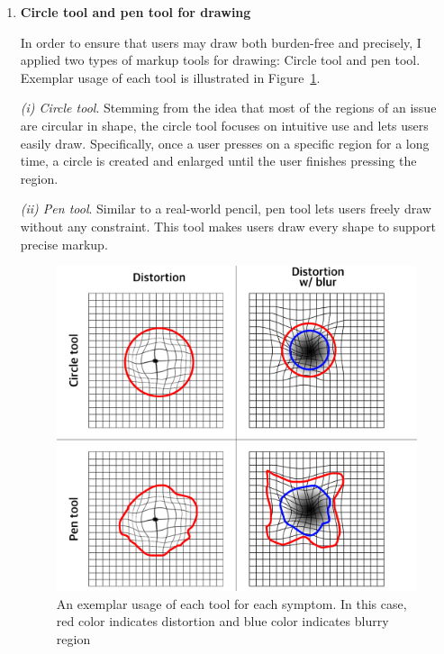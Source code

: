 \begin{enumerate}
    \item \textbf{Circle tool and pen tool for drawing}
    
    In order to ensure that users may draw both burden-free and precisely, I applied two types of markup tools for drawing: Circle tool and pen tool. Exemplar usage of each tool is illustrated in Figure~\ref{fig:drawings}.
    
    \textit{(i) Circle tool}. Stemming from the idea that most of the regions of an issue are circular in shape, the circle tool focuses on intuitive use and lets users easily draw. Specifically, once a user presses on a specific region for a long time, a circle is created and enlarged until the user finishes pressing the region.%
    
    \textit{(ii) Pen tool}. Similar to a real-world pencil, pen tool lets users freely draw without any constraint. This tool makes users draw every shape to support precise markup.
    
    
    \begin{figure}[h!]
        \centering
        \includegraphics[width=.9\linewidth]{figure/drawings.jpg}
        \caption{An exemplar usage of each tool for each symptom. In this case, red color indicates distortion and blue color indicates blurry region}
        \label{fig:drawings}
    \end{figure}
    

\end{enumerate}

